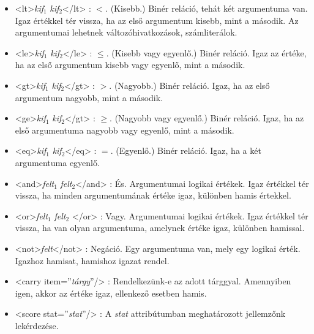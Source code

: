 \documentclass[12pt,a4paper,oneside]{report}
\newcommand{\xtag}[1]{{\color{Tag}#1}}
\newcommand{\xattr}[2]{{\color{Attr}#1}={\color{Value}''#2''}}
\newcommand{\attr}{\emph}
\newcommand{\kif}{\emph{kif}}
\newcommand{\felt}{\emph{felt}}
\begin{document}
        \begin{itemize}
          \item <\xtag{lt}>\kif$_1$ \kif$_2$<\xtag{/lt}> : $<$. (Kisebb.) Binér
            reláció, tehát két argumentuma van. Igaz értékkel tér vissza,
            ha az első argumentum kisebb, mint a második. Az argumentumai
            lehetnek változóhivatkozások, számliterálok.
            
          \item <\xtag{le}>\kif$_1$ \kif$_2$<\xtag{/le}> : $\le$. (Kisebb vagy
            egyenlő.) Binér reláció. Igaz az értéke, ha az első argumentum
            kisebb vagy egyenlő, mint a második.
            
          \item <\xtag{gt}>\kif$_1$ \kif$_2$<\xtag{/gt}> : $>$. (Nagyobb.) Binér
            reláció. Igaz, ha az első argumentum nagyobb, mint a második.
            
          \item <\xtag{ge}>\kif$_1$ \kif$_2$<\xtag{/gt}> : $\ge$. (Nagyobb vagy
            egyenlő.) Binér reláció. Igaz, ha az első argumentuma nagyobb
            vagy egyenlő, mint a második.
            
          \item <\xtag{eq}>\kif$_1$ \kif$_2$<\xtag{/eq}> : $=$. (Egyenlő.)
            Binér reláció. Igaz, ha a két argumentuma egyenlő.
            
          \item <\xtag{and}>\felt$_1$ \felt$_2$<\xtag{/and}> : És. Argumentumai
            logikai értékek. Igaz értékkel tér vissza, ha minden
            argumentumának értéke igaz, különben hamis értekkel.
            
          \item <\xtag{or}>\felt$_1$ \felt$_2$ <\xtag{/or}> : Vagy. Argumentumai
            logikai értékek. Igaz értékkel tér vissza, ha van olyan
            argumentuma, amelynek értéke igaz, különben hamissal.
            
          \item <\xtag{not}>\felt<\xtag{/not}> : Negáció. Egy
            argumentuma van, mely egy logikai érték. Igazhoz hamisat,
            hamishoz igazat rendel.
          \item <\xtag{carry} \xattr{item}{\emph{tárgy}}/>
            : Rendelkezünk-e az
            adott tárggyal. Amennyiben igen, akkor az értéke igaz,
            ellenkező esetben hamis.
            
          \item <\xtag{score} \xattr{stat}{\emph{stat}}/>
            : A \attr{stat}
            attribútumban meghatározott jellemzőnk lekérdezése.
        \end{itemize}
\end{document}
